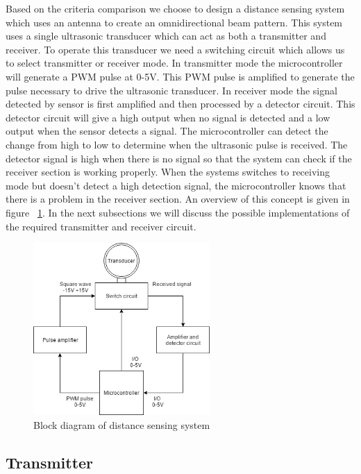 Based on the criteria comparison we choose to design a distance sensing system which uses an antenna to create an omnidirectional beam pattern. This system uses a single ultrasonic transducer which can act as both a transmitter and receiver. To operate this transducer we need a switching circuit which allows us to select transmitter or receiver mode. In transmitter mode the microcontroller will generate a PWM pulse at 0-5V. This PWM pulse is amplified to generate the pulse necessary to drive the ultrasonic transducer. In receiver mode the signal detected by sensor is first amplified and then processed by a detector circuit. This detector circuit will give a high output when no signal is detected and a low output when the sensor detects a signal. The microcontroller can detect the change from high to low to determine when the ultrasonic pulse is received. The detector signal is high when there is no signal so that the system can check if the receiver section is working properly. When the systems switches to receiving mode but doesn't detect a high detection signal, the microcontroller knows that there is a problem in the receiver section. An overview of this concept is given in figure ~\ref{fig:ultra3}. In the next subsections we will discuss the possible implementations of the required transmitter and receiver circuit.

\begin{figure}[H]
\centering
\includegraphics[width=0.6\textwidth]{Figures/concept.png}
\caption{Block diagram of distance sensing system}
\label{fig:ultra3}
\end{figure}

\subsection{Transmitter}
\label{chap:trans}

